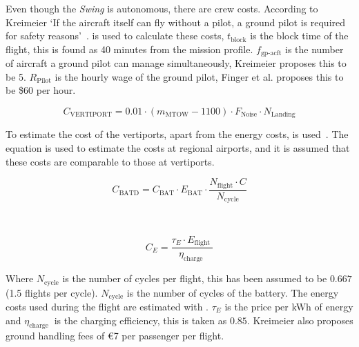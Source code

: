 Even though the \textit{Swing} is autonomous, there are crew costs.
According to Kreimeier \enquote*{If the aircraft itself can fly without a pilot, a ground pilot is required for safety reasons}~\cite{Kreimeier2018}.  is used to calculate these costs, $t_{\text{block}}$ is the block time of the flight, this is found as 40 minutes from the mission profile. $f_{\text{gp-acft}}$ is the number of aircraft a ground pilot can manage simultaneously, Kreimeier proposes this to be 5. $R_{\text{Pilot}}$ is the hourly wage of the ground pilot, Finger et al.
proposes this to be \$60 per hour\cite{finger2019cost_Hybrid_GA_aircraft}.

\begin{equation}
    \label{eq:cost:oper:vertiport}
    C_{\text{VERTIPORT}} = 0.01 \cdot\left(m_{\text {MTOW}}-1100 \right) \cdot F_{\text{Noise}} \cdot N_{\text{Landing}}
\end{equation}

To estimate the cost of the vertiports, apart from the energy costs,  is used~\cite{Kreimeier2018}.
The equation is used to estimate the costs at regional airports, and it is assumed that these costs are comparable to those at vertiports.

\begin{minipage}{0.45\linewidth}
\begin{equation}
    \label{eq:cost:oper:battery_replacement}
    C_{\text{BATD}}=C_{\text{BAT}} \cdot E_{\text{BAT}} \cdot \frac{N_{\text{flight}} \cdot C}{N_{\text{cycle}}}
\end{equation}
\end{minipage}
~
\begin{minipage}{0.45\linewidth}
\begin{equation}
    \label{eq:cost:oper:energy}
    C_E=\frac{\tau_E \cdot E_{\text {flight }}}{\eta_{\text {charge }}}
\end{equation}
\end{minipage}

Where $N_{\text{cycle}}$ is the number of cycles per flight, this has been assumed to be $0.667$ (1.5 flights per cycle). $N_{\text{cycle}}$ is the number of cycles of the battery.
The energy costs used during the flight are estimated with . $\tau_E$ is the price per kWh of energy and $\eta_{\text {charge }}$ is the charging efficiency, this is taken as $0.85$\cite{Kreimeier2018}.
Kreimeier also proposes ground handling fees of €7 per passenger per flight.


